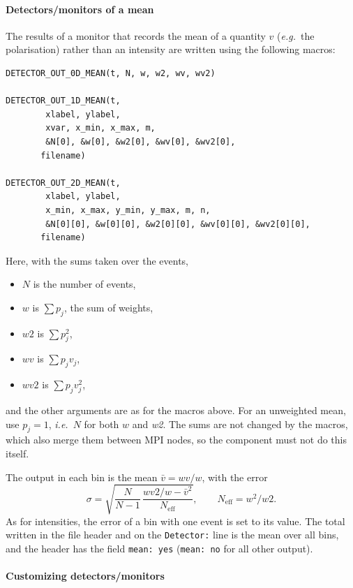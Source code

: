 \paragraph{Detectors/monitors of a mean}
\label{s:DETECTOR_OUT_MEAN}

The results of a monitor that records the mean of a quantity $v$ (\textit{e.g.}\
the polarisation) rather than an intensity are written using the following macros:
\begin{verbatim}
DETECTOR_OUT_0D_MEAN(t, N, w, w2, wv, wv2)

DETECTOR_OUT_1D_MEAN(t,
        xlabel, ylabel,
        xvar, x_min, x_max, m,
        &N[0], &w[0], &w2[0], &wv[0], &wv2[0],
       filename)

DETECTOR_OUT_2D_MEAN(t,
        xlabel, ylabel,
        x_min, x_max, y_min, y_max, m, n,
        &N[0][0], &w[0][0], &w2[0][0], &wv[0][0], &wv2[0][0],
       filename)
\end{verbatim}
Here, with the sums taken over the events,
\begin{itemize}
\item $N$ is the number of events,
\item $w$ is $\sum p_j$, the sum of weights,
\item $\textit{w2}$ is $\sum p_j^2$,
\item $\textit{wv}$ is $\sum p_j v_j$,
\item $\textit{wv2}$ is $\sum p_j v_j^2$,
\end{itemize}
and the other arguments are as for the macros above. For an unweighted mean, use
$p_j=1$, \textit{i.e.}\ $N$ for both $w$ and \textit{w2}. The sums are not changed
by the macros, which also merge them between MPI nodes, so the component
must not do this itself.

The output in each bin is the mean $\bar{v}=\textit{wv}/w$, with the error
\begin{equation}
\sigma = \sqrt{\frac{N}{N-1}\,\frac{\textit{wv2}/w-\bar{v}^2}{N_\mathrm{eff}}}, \qquad
N_\mathrm{eff} = w^2/\textit{w2} .
\end{equation}
As for intensities, the error of a bin with one event is set to its value.
The total written in the file header and on the \verb+Detector:+ line is
the mean over all bins, and the header has the field
\verb+mean: yes+ (\verb+mean: no+ for all other output).

\paragraph{Customizing detectors/monitors}

